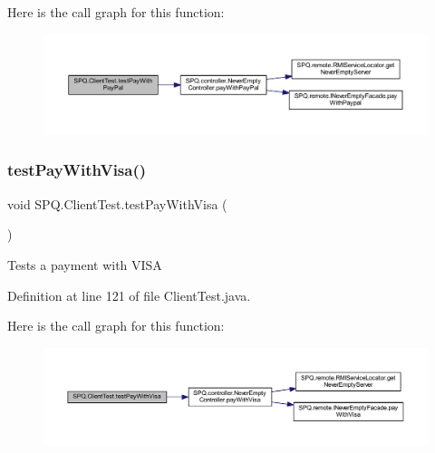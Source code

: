 Here is the call graph for this function\+:
\nopagebreak
\begin{figure}[H]
\begin{center}
\leavevmode
\includegraphics[width=350pt]{class_s_p_q_1_1_client_test_afe92931ed84ed471c853004681be4072_cgraph}
\end{center}
\end{figure}
\mbox{\label{class_s_p_q_1_1_client_test_ae6f432ec2c9b37a231883ad94ffb624d}} 
\subsubsection{\texorpdfstring{test\+Pay\+With\+Visa()}{testPayWithVisa()}}
{\footnotesize\ttfamily void S\+P\+Q.\+Client\+Test.\+test\+Pay\+With\+Visa (\begin{DoxyParamCaption}{ }\end{DoxyParamCaption})}

Tests a payment with V\+I\+SA 

Definition at line 121 of file Client\+Test.\+java.

Here is the call graph for this function\+:
\nopagebreak
\begin{figure}[H]
\begin{center}
\leavevmode
\includegraphics[width=350pt]{class_s_p_q_1_1_client_test_ae6f432ec2c9b37a231883ad94ffb624d_cgraph}
\end{center}
\end{figure}
\mbox{\label{class_s_p_q_1_1_client_test_ae74ec6f1a9672b8dbffeaf89abe44bbd}} 
